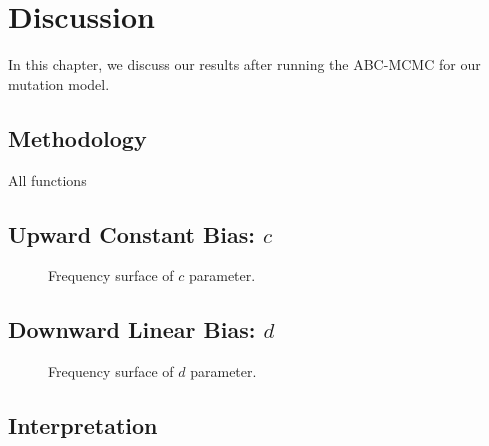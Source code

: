 \chapter{Discussion}\label{ch:discussion}
In this chapter, we discuss our results after running the ABC-MCMC for our mutation model.

\section{Methodology}\label{sec:methodology}
All functions

\section{Upward Constant Bias: $c$}\label{sec:upwardConstantBias}
\begin{figure}[t]
    \centering{}
    \caption{Frequency surface of $c$ parameter.
    }\label{fig:cData}
\end{figure}

\section{Downward Linear Bias: $d$}\label{sec:downwardLinearBias}
\begin{figure}[t]
    \centering{}
    \caption{Frequency surface of $d$ parameter.
    }\label{fig:dData}
\end{figure}

\section{Interpretation}\label{sec:interpretation}